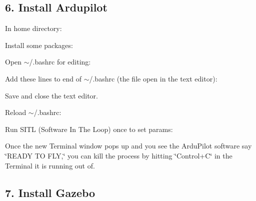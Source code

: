 \subsection*{6. Install Ardupilot}

In home directory\+: 
\begin{DoxyCode}{0}
\end{DoxyCode}


Install some packages\+: 
\begin{DoxyCode}{0}
\end{DoxyCode}


Open {\ttfamily $\sim$/.bashrc} for editing\+: 
\begin{DoxyCode}{0}
\end{DoxyCode}


Add these lines to end of {\ttfamily $\sim$/.bashrc} (the file open in the text editor)\+: 
\begin{DoxyCode}{0}
\end{DoxyCode}


Save and close the text editor.

Reload {\ttfamily $\sim$/.bashrc}\+: 
\begin{DoxyCode}{0}
\end{DoxyCode}


Run S\+I\+TL (Software In The Loop) once to set params\+: 
\begin{DoxyCode}{0}
\end{DoxyCode}


Once the new Terminal window pops up and you see the Ardu\+Pilot software say \char`\"{}\+R\+E\+A\+D\+Y T\+O F\+L\+Y,\char`\"{} you can kill the process by hitting \char`\"{}\+Control+\+C\char`\"{} in the Terminal it is running out of.

\subsection*{7. Install Gazebo}

